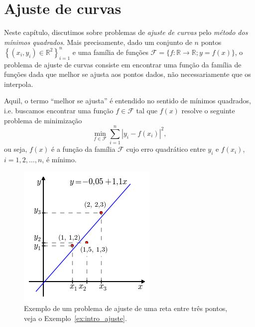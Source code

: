 
%

\chapter{Ajuste de curvas}

Neste capítulo, discutimos sobre problemas de \emph{ajuste de curvas} pelo \emph{método dos mínimos quadrados}. Mais precisamente, dado um conjunto de $n$ pontos $\left\{(x_i, y_i)\in \mathbb{R}^2\right\}_{i=1}^n$ e uma família de funções $\mathcal{F} = \{f:\mathbb{R}\to\mathbb{R}; y = f(x)\}$, o problema de ajuste de curvas consiste em encontrar uma função da família de funções dada que melhor se ajusta aos pontos dados, não necessariamente que os interpola. 

Aquil, o termo ``melhor se ajusta'' é entendido no sentido de mínimos quadrados, i.e. buscamos encontrar uma função $f\in\mathcal{F}$ tal que $f(x)$ resolve o seguinte problema de minimização
\begin{equation*}
  \min_{f\in\mathcal{F}} \sum_{i=1}^n |y_i - f(x_i)|^2,
\end{equation*}
ou seja, $f(x)$ é a função da família $\mathcal{F}$ cujo erro quadrático entre $y_i$ e $f(x_i)$, $i = 1, 2, \dotsc, n$, é mínimo.

\begin{figure}
  \centering
  \includegraphics[scale=0.9]{./cap_ajuste/pics/ex_intro_ajuste/ex_intro_ajuste}
  \caption{Exemplo de um problema de ajuste de uma reta entre três pontos, veja o Exemplo~\ref{ex:intro_ajuste}.}
  \label{fig:ex_intro}
\end{figure}


